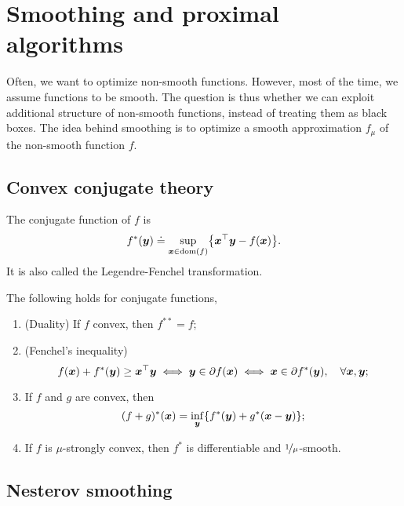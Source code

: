\section{Smoothing and proximal algorithms}

Often, we want to optimize non-smooth functions. However, most of the time, we assume functions to
be smooth. The question is thus whether we can exploit additional structure of non-smooth
functions, instead of treating them as black boxes. The idea behind smoothing is to optimize a
smooth approximation $f_{\mu}$ of the non-smooth function $f$.

\subsection{Convex conjugate theory}

\begin{definition}
    The conjugate function of $f$ is \[
        f^*(\vec{y}) \doteq \sup_{\vec{x} \in \dom{f}} \lft\{ \transpose{\vec{x}} \vec{y} - f(\vec{x}) \rgt\}.
    \]
    It is also called the Legendre-Fenchel transformation.
\end{definition}

\begin{lemma}
    The following holds for conjugate functions,
    \begin{enumerate}
        \item (Duality) If $f$ convex, then $f^{**} = f$;
        \item (Fenchel's inequality) \[
                  f(\bm{x}) + f^*(\bm{y}) \geq \bm{x}^\top \bm{y} \iff \bm{y} \in \partial f(\bm{x}) \iff \bm{x} \in \partial f^*(\bm{y}), \quad \forall \bm{x}, \bm{y};
              \]
        \item If $f$ and $g$ are convex, then \[
                  (f+g)^*(\vec{x}) = \inf_{\vec{y}} \lft\{ f^*(\vec{y}) + g^*(\vec{x} - \vec{y}) \rgt\};
              \]
        \item If $f$ is $\mu$-strongly convex, then $f^*$ is differentiable and $\nicefrac{1}{\mu}$-smooth.
    \end{enumerate}
\end{lemma}

\subsection{Nesterov smoothing}

